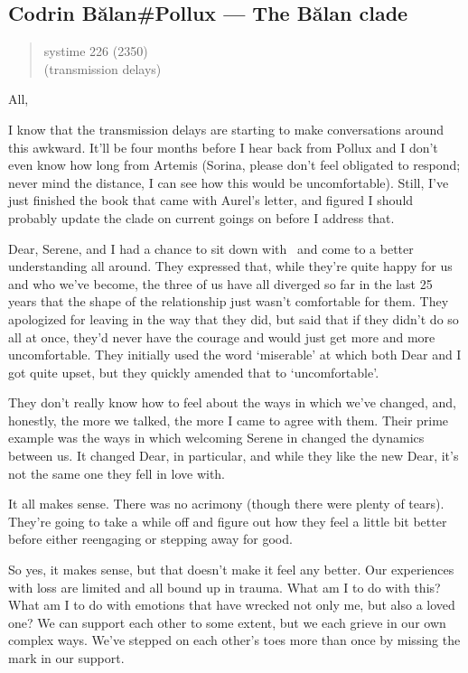 \hypertarget{codrin-bux103lanpollux-the-bux103lan-clade}{%
\subsection{Codrin Bălan\#Pollux — The Bălan clade}\label{codrin-bux103lanpollux-the-bux103lan-clade}}

\begin{quote}
systime 226 (2350)\\
(transmission delays)
\end{quote}

All,

I know that the transmission delays are starting to make conversations around this awkward. It'll be four months before I hear back from Pollux and I don't even know how long from Artemis (Sorina, please don't feel obligated to respond; never mind the distance, I can see how this would be uncomfortable). Still, I've just finished the book that came with Aurel's letter, and figured I should probably update the clade on current goings on before I address that.

Dear, Serene, and I had a chance to sit down with \Partner\ and come to a better understanding all around. They expressed that, while they're quite happy for us and who we've become, the three of us have all diverged so far in the last 25 years that the shape of the relationship just wasn't comfortable for them. They apologized for leaving in the way that they did, but said that if they didn't do so all at once, they'd never have the courage and would just get more and more uncomfortable. They initially used the word `miserable' at which both Dear and I got quite upset, but they quickly amended that to `uncomfortable'.

They don't really know how to feel about the ways in which we've changed, and, honestly, the more we talked, the more I came to agree with them. Their prime example was the ways in which welcoming Serene in changed the dynamics between us. It changed Dear, in particular, and while they like the new Dear, it's not the same one they fell in love with.

It all makes sense. There was no acrimony (though there were plenty of tears). They're going to take a while off and figure out how they feel a little bit better before either reengaging or stepping away for good.

So yes, it makes sense, but that doesn't make it feel any better. Our experiences with loss are limited and all bound up in trauma. What am I to do with this? What am I to do with emotions that have wrecked not only me, but also a loved one? We can support each other to some extent, but we each grieve in our own complex ways. We've stepped on each other's toes more than once by missing the mark in our support.

